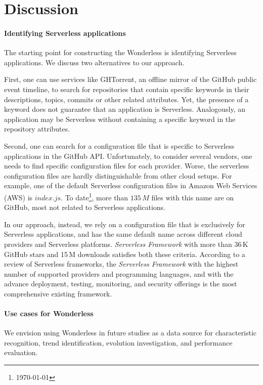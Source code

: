 
\section{Discussion}
\label{discussion}

\paragraph{Identifying Serverless applications}
The starting point for constructing the Wonderless is identifying Serverless 
applications. We discuss two alternatives to our approach.

First, one can use services like GHTorrent\cite{gousios2012ghtorrent}, 
an offline mirror of the GitHub public event timeline, to search for repositories 
that contain specific keywords in their descriptions, topics, commits or other 
related attributes. Yet, the presence of a keyword does not guarantee 
that an application is Serverless. Analogously, an application may be Serverless 
without containing a specific keyword in the repository attributes.

Second, one can search for a configuration file that is 
specific to Serverless applications in the GitHub API. Unfortunately, to consider several vendors, 
one needs to find specific configuration files for each provider.
Worse, the serverless configuration files are hardly distinguishable from other cloud setups. 
For example, one of the default Serverless configuration files in Amazon 
Web Services\,(AWS) is $index.js$. To date\footnote{\today}, 
more than $135 \, M$ files with this name are on GitHub, most not 
related to Serverless applications. 

In our approach, instead, we rely on a configuration file that is exclusively 
for Serverless applications, and has the same default name across 
different cloud providers and Serverless platforms. 
\emph{Serverless Framework} with more than 36\,K GitHub stars and 15\,M 
downloads satisfies both these criteria. According to a review of Serverless 
frameworks\cite{kritikos2018review}, the \emph{Serverless Framework} 
with the highest number of supported providers 
and programming languages, and with the advance deployment, testing, 
monitoring, and security offerings is the most comprehensive existing framework. 


\paragraph{Use cases for Wonderless}
We envision using Wonderless in future studies as a data source for characteristic recognition, 
trend identification, evolution investigation, and performance evaluation.

